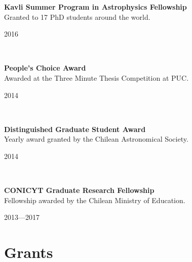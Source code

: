 \documentclass[12pt, a4paper]{article} %
\begin{document}
\begin{minipage}[t]{0.7\textwidth}
\begin{flushleft}%
  \setlength{\leftskip}{0.2cm}%
\textbf{Kavli Summer Program in Astrophysics Fellowship}\\
Granted to 17 PhD students around the world.
\end{flushleft}
\end{minipage}
\begin{minipage}[t]{0.3\textwidth}
\hfill 2016
\end{minipage}\\

\begin{minipage}[t]{0.7\textwidth}
\begin{flushleft}%
  \setlength{\leftskip}{0.2cm}%
\textbf{People's Choice Award}\\
 Awarded at the Three Minute Thesis\textsuperscript{\textregistered} Competition at PUC.
 \end{flushleft}
\end{minipage}
\begin{minipage}[t]{0.3\textwidth}
\hfill 2014
\end{minipage}\\

\begin{minipage}[t]{0.7\textwidth}
\begin{flushleft}%
  \setlength{\leftskip}{0.2cm}%
\textbf{Distinguished Graduate Student Award}\\
 Yearly award granted by the Chilean Astronomical Society.
 \end{flushleft}
\end{minipage}
\begin{minipage}[t]{0.3\textwidth}
\hfill 2014
\end{minipage}\\

\begin{minipage}[t]{0.7\textwidth}
\begin{flushleft}%
  \setlength{\leftskip}{0.2cm}%
\textbf{CONICYT Graduate Research Fellowship}\\
Fellowship awarded by the Chilean Ministry of Education.
\end{flushleft}
\end{minipage}
\begin{minipage}[t]{0.3\textwidth}
\hfill 2013---2017
\end{minipage}

\section*{Grants}
\end{document}
